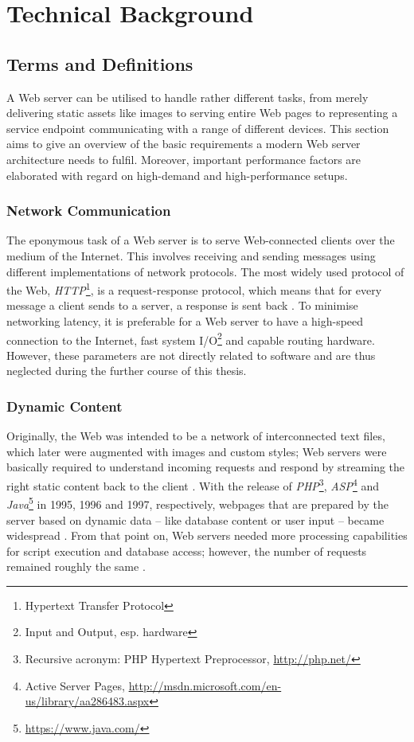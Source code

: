 \chapter{Technical Background}
\label{lab:technical}

\section{Terms and Definitions}
\label{sec:terms}

A Web server can be utilised to handle rather different tasks, from merely delivering static assets like images to serving entire Web pages to representing a service endpoint communicating with a range of different devices. This section aims to give an overview of the basic requirements a modern Web server architecture needs to fulfil. Moreover, important performance factors are elaborated with regard on high-demand and high-performance setups.

\subsection{Network Communication}
The eponymous task of a Web server is to serve Web-connected clients over the medium of the Internet. This involves receiving and sending messages using different implementations of network protocols. The most widely used protocol of the Web, \textit{HTTP}\footnote{Hypertext Transfer Protocol}, is a request-response protocol, which means that for every message a client sends to a server, a response is sent back \cite{http}. To minimise networking latency, it is preferable for a Web server to have a high-speed connection to the Internet, fast system I/O\footnote{\label{lab:io}Input and Output, esp. hardware} and capable routing hardware. However, these parameters are not directly related to software and are thus neglected during the further course of this thesis.

\subsection{Dynamic Content}
Originally, the Web was intended to be a network of interconnected text files, which later were augmented with images and custom styles; Web servers were basically required to understand incoming requests and respond by streaming the right static content back to the client \cite{http}. With the release of \textit{PHP}\footnote{Recursive acronym: PHP Hypertext Preprocessor, \url{http://php.net/}}, \textit{ASP}\footnote{Active Server Pages, \url{http://msdn.microsoft.com/en-us/library/aa286483.aspx}} and \textit{Java}\footnote{\url{https://www.java.com/}} in 1995, 1996 and 1997, respectively, webpages that are prepared by the server based on dynamic data -- like database content or user input -- became widespread \cite{webhistory}. From that point on, Web servers needed more processing capabilities for script execution and database access; however, the number of requests remained roughly the same \cite{webhistory}.

